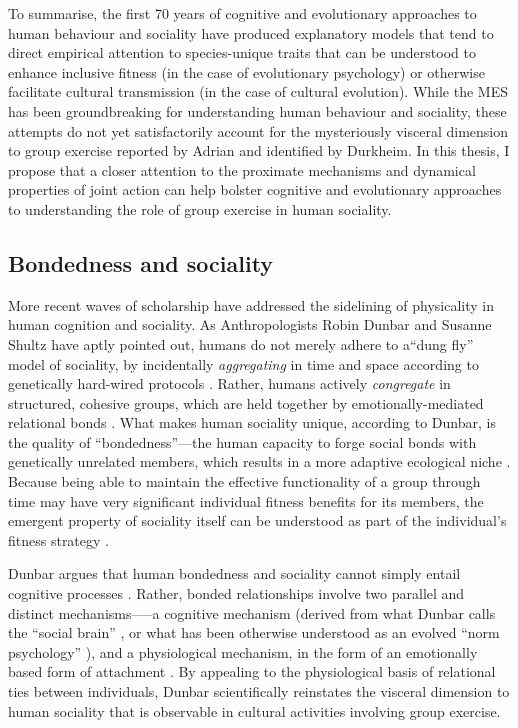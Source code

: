\begin{CJK}{UTF8}{gbsn}
To summarise, the first 70 years of cognitive and evolutionary approaches to human behaviour and sociality have produced explanatory models that tend to direct empirical attention to species-unique traits that can be understood to enhance inclusive fitness (in the case of evolutionary psychology) or otherwise facilitate cultural transmission (in the case of cultural evolution).  While the MES has been groundbreaking for understanding human behaviour and sociality, these attempts do not yet satisfactorily account for the mysteriously visceral dimension to group exercise reported by Adrian and identified by Durkheim.  In this thesis, I propose that a closer attention to the proximate mechanisms and dynamical properties of joint action can help bolster cognitive and evolutionary approaches to understanding the role of group exercise in human sociality.



\subsection{Bondedness and sociality\label{sect:bondednessSociality}}
More recent waves of scholarship have addressed the sidelining of physicality in human cognition and sociality.  As Anthropologists Robin Dunbar and Susanne Shultz have aptly pointed out, humans do not merely adhere to a``dung fly'' model of sociality, by incidentally \textit{aggregating} in time and space according to genetically hard-wired protocols \citep[see][]{Wilson1975}.  Rather, humans actively \textit{congregate} in structured, cohesive groups, which are held together by emotionally-mediated relational bonds \citep[777]{Dunbar2010}.  What makes human sociality unique, according to Dunbar, is the quality of ``bondedness''---the human capacity to forge social bonds with genetically unrelated members, which results in a more adaptive ecological niche \citep[see][]{Odling-Smee2003}.
Because being able to maintain the effective functionality of a group through time may have very significant individual fitness benefits for its members, the emergent property of sociality itself can be understood as part of the individual’s fitness strategy \citep{Dunbar2010b,Nowak2010}.

Dunbar argues that human bondedness and sociality cannot simply entail cognitive processes \citep[at least not in the way cognitive processes are narrowly rendered by game-theoretic and gene-culture coevolutionary models;][]{Dunbar2010}.  Rather, bonded relationships involve two parallel and distinct mechanisms—--a cognitive mechanism (derived from what Dunbar calls the ``social brain'' \citep{Dunbar1998}, or what has been otherwise understood as an evolved ``norm psychology'' \citep{Chudek2011}), and a physiological mechanism, in the form of an emotionally based form of attachment \citep{Dunbar2010b}.  By appealing to the physiological basis of relational ties between individuals, Dunbar scientifically reinstates the visceral dimension to human sociality that is observable in cultural activities involving group exercise.


\end{CJK}
